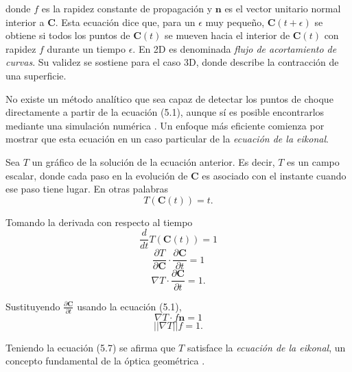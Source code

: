 \noindent
donde $f$ es la rapidez constante de propagación y $\boldsymbol{n}$ es el vector unitario normal interior a $\boldsymbol{C}$. Esta ecuación dice que, para un $\epsilon$ muy pequeño, $\boldsymbol{C}(t + \epsilon)$ se obtiene si todos los puntos de $\boldsymbol{C}(t)$ se mueven hacia el interior de $\boldsymbol{C}(t)$ con rapidez $f$ durante un tiempo $\epsilon$. En 2D es denominada \textit{flujo de acortamiento de curvas}. Su validez se sostiene para el caso 3D, donde describe la contracción de una superficie.

No existe un método analítico que sea capaz de detectar los puntos de choque directamente a partir de la ecuación (5.1), aunque sí es posible encontrarlos mediante una simulación numérica \cite{sethian1996fast}. Un enfoque más eficiente comienza por mostrar que esta ecuación en un caso particular de la \textit{ecuación de la eikonal}.

Sea $T$ un gráfico de la solución de la ecuación anterior. Es decir, $T$ es un campo escalar, donde cada paso en la evolución de $\boldsymbol{C}$ es asociado con el instante cuando ese paso tiene lugar. En otras palabras
\begin{equation}
T(\boldsymbol{C}(t)) = t.
\end{equation}

\noindent
Tomando la derivada con respecto al tiempo
\begin{equation}
\frac{d}{dt}T(\boldsymbol{C}(t)) = 1
\end{equation}
\begin{equation}
\frac{\partial T}{\partial \boldsymbol{C}}\cdot\frac{\partial \boldsymbol{C}}{\partial t} = 1
\end{equation}
\begin{equation}
\nabla T\cdot\frac{\partial \boldsymbol{C}}{\partial t} = 1.
\end{equation}

\noindent
Sustituyendo $\frac{\partial \boldsymbol{C}}{\partial t}$ usando la ecuación (5.1),
\begin{equation}
\nabla T\cdot f\boldsymbol{n} = 1
\end{equation}
\begin{equation}
||\nabla T|| f = 1.
\end{equation}

\noindent
Teniendo la ecuación (5.7) se afirma que $T$ satisface la \textit{ecuación de la eikonal}, un concepto fundamental de la óptica geométrica \cite{luneburg1964mathematical}.

